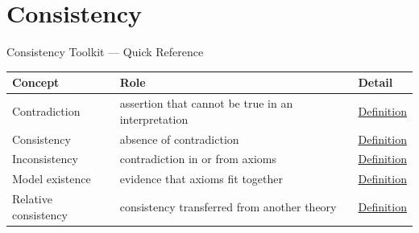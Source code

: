 \section{Consistency}

\begin{toolkitbox}{Consistency Toolkit --- Quick Reference}
\small
\begin{tabular}{l l l}
\toprule
\textbf{Concept} & \textbf{Role} & \textbf{Detail} \\
\midrule
Contradiction & assertion that cannot be true in an interpretation & \hyperref[def:axiom-systems-contradiction]{Definition} \\
Consistency & absence of contradiction & \hyperref[def:axiom-systems-consistent-axiom-system]{Definition} \\
Inconsistency & contradiction in or from axioms & \hyperref[def:axiom-systems-inconsistent-axiom-system]{Definition} \\
Model existence & evidence that axioms fit together & \hyperref[def:axiom-systems-model-existence-criterion]{Definition} \\
Relative consistency & consistency transferred from another theory & \hyperref[def:axiom-systems-relative-consistency]{Definition} \\
\bottomrule
\end{tabular}
\end{toolkitbox}


